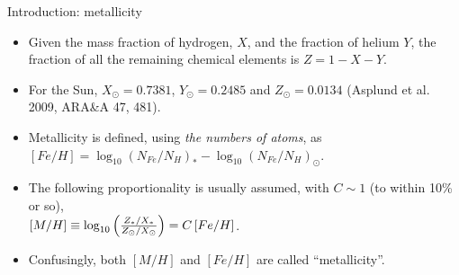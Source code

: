 \documentclass[letterpaper,landscape]{slides}
\begin{document}
\begin{slide}
\begin{center}
{\large \color{red} Introduction: metallicity}
\end{center}

\begin{itemize}
\item
Given the {\color{red} mass fraction} of hydrogen, $X$, and the fraction of helium $Y$, the fraction of all the remaining chemical 
elements is $Z = 1 - X - Y$. 
\item 
For the Sun, $X_\odot=0.7381$, $Y_\odot=0.2485$ and $Z_\odot = 0.0134$
(Asplund et al. 2009, ARA\&A 47, 481). 
\item Metallicity is defined, using {\color{red} {\it the numbers of atoms}}, as \\
   $ [Fe/H] = \log_{10}\left( N_{Fe} / N_H \right)_{\ast} - \log_{10}\left( N_{Fe} / N_H \right)_\odot$. 
\item 
The following proportionality is usually assumed, with $C\sim 1$ (to within 10\% or so), \\
$ [M/H] \equiv \log_{10}\left({ Z_\ast/X_\ast \over Z_\odot / X_\odot }\right)  = C \, [Fe/H]$. 
\item Confusingly, both $[M/H]$ and $[Fe/H]$ are called ``metallicity''. 
\end{itemize}  


\vfill
\end{slide}
\end{document}
